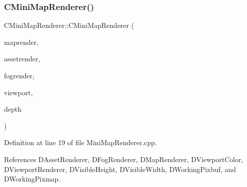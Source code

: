 \subsubsection{\texorpdfstring{C\+Mini\+Map\+Renderer()}{CMiniMapRenderer()}}
{\footnotesize\ttfamily C\+Mini\+Map\+Renderer\+::\+C\+Mini\+Map\+Renderer (\begin{DoxyParamCaption}\item[{std\+::shared\+\_\+ptr$<$ \hyperlink{classCMapRenderer}{C\+Map\+Renderer} $>$}]{maprender,  }\item[{std\+::shared\+\_\+ptr$<$ \hyperlink{classCAssetRenderer}{C\+Asset\+Renderer} $>$}]{assetrender,  }\item[{std\+::shared\+\_\+ptr$<$ \hyperlink{classCFogRenderer}{C\+Fog\+Renderer} $>$}]{fogrender,  }\item[{std\+::shared\+\_\+ptr$<$ \hyperlink{classCViewportRenderer}{C\+Viewport\+Renderer} $>$}]{viewport,  }\item[{gint}]{depth }\end{DoxyParamCaption})}



Definition at line 19 of file Mini\+Map\+Renderer.\+cpp.



References D\+Asset\+Renderer, D\+Fog\+Renderer, D\+Map\+Renderer, D\+Viewport\+Color, D\+Viewport\+Renderer, D\+Visible\+Height, D\+Visible\+Width, D\+Working\+Pixbuf, and D\+Working\+Pixmap.


